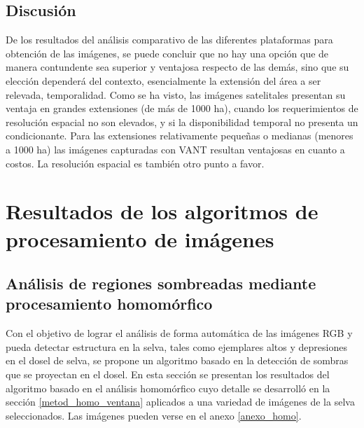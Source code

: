 \subsection{Discusión}
De los resultados del análisis comparativo de las diferentes plataformas para obtención de las imágenes, se puede concluir que no hay una opción que de manera contundente sea superior y ventajosa respecto de las demás, sino que su elección dependerá del contexto, esencialmente la extensión del área a ser relevada, temporalidad. Como se ha visto, las imágenes satelitales presentan su ventaja en grandes extensiones (de más de 1000 ha), cuando los requerimientos de resolución espacial no son elevados, y si la disponibilidad temporal no presenta un condicionante. Para las extensiones relativamente pequeñas o medianas (menores a 1000 ha) las imágenes capturadas con VANT resultan ventajosas en cuanto a costos. La resolución espacial es también otro punto a favor.
\section{Resultados de los algoritmos de procesamiento de imágenes}
\subsection{Análisis de regiones sombreadas mediante procesamiento homomórfico} \label{resultados homo}
Con el objetivo de lograr el análisis de forma automática de las imágenes RGB y pueda detectar estructura en la selva, tales como ejemplares altos y depresiones en el dosel de selva, se propone un algoritmo basado en la detección de sombras que se proyectan en el dosel. En esta sección se presentan los resultados del algoritmo basado en el análisis homomórfico cuyo detalle se desarrolló en la sección \ref{metod_homo_ventana} aplicados a una variedad de imágenes de la selva seleccionados. Las imágenes pueden verse en el anexo \ref{anexo_homo}.\\

